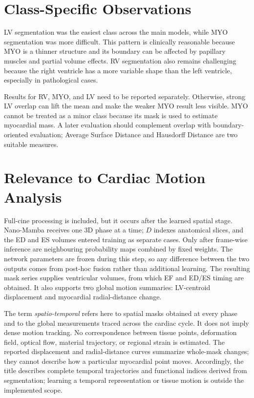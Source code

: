 \section{Class-Specific Observations}
LV segmentation was the easiest class across the main models, while MYO segmentation was more difficult. This pattern is clinically reasonable because MYO is a thinner structure and its boundary can be affected by papillary muscles and partial volume effects. RV segmentation also remains challenging because the right ventricle has a more variable shape than the left ventricle, especially in pathological cases.

Results for RV, MYO, and LV need to be reported separately. Otherwise, strong LV overlap can lift the mean and make the weaker MYO result less visible. MYO cannot be treated as a minor class because its mask is used to estimate myocardial mass. A later evaluation should complement overlap with boundary-oriented evaluation; Average Surface Distance and Hausdorff Distance are two suitable measures.

\section{Relevance to Cardiac Motion Analysis}
Full-cine processing is included, but it occurs after the learned spatial stage. Nano-Mamba receives one 3D phase at a time; $D$ indexes anatomical slices, and the ED and ES volumes entered training as separate cases. Only after frame-wise inference are neighbouring probability maps combined by fixed weights. The network parameters are frozen during this step, so any difference between the two outputs comes from post-hoc fusion rather than additional learning. The resulting mask series supplies ventricular volumes, from which EF and ED/ES timing are obtained. It also supports two global motion summaries: LV-centroid displacement and myocardial radial-distance change.

The term \emph{spatio-temporal} refers here to spatial masks obtained at every phase and to the global measurements traced across the cardiac cycle. It does not imply dense motion tracking. No correspondence between tissue points, deformation field, optical flow, material trajectory, or regional strain is estimated. The reported displacement and radial-distance curves summarize whole-mask changes; they cannot describe how a particular myocardial point moves. Accordingly, the title describes complete temporal trajectories and functional indices derived from segmentation; learning a temporal representation or tissue motion is outside the implemented scope.

